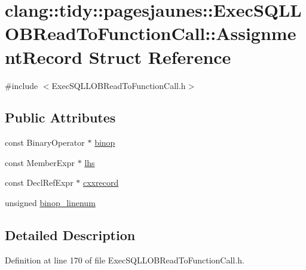 \hypertarget{structclang_1_1tidy_1_1pagesjaunes_1_1_exec_s_q_l_l_o_b_read_to_function_call_1_1_assignment_record}{}\section{clang\+:\+:tidy\+:\+:pagesjaunes\+:\+:Exec\+S\+Q\+L\+L\+O\+B\+Read\+To\+Function\+Call\+:\+:Assignment\+Record Struct Reference}
\label{structclang_1_1tidy_1_1pagesjaunes_1_1_exec_s_q_l_l_o_b_read_to_function_call_1_1_assignment_record}


{\ttfamily \#include $<$Exec\+S\+Q\+L\+L\+O\+B\+Read\+To\+Function\+Call.\+h$>$}

\subsection*{Public Attributes}
\begin{DoxyCompactItemize}
\item 
const Binary\+Operator $\ast$ \hyperlink{structclang_1_1tidy_1_1pagesjaunes_1_1_exec_s_q_l_l_o_b_read_to_function_call_1_1_assignment_record_a6782daae36d05bd1e6c4068d4ecb46b0}{binop}
\item 
const Member\+Expr $\ast$ \hyperlink{structclang_1_1tidy_1_1pagesjaunes_1_1_exec_s_q_l_l_o_b_read_to_function_call_1_1_assignment_record_a0c2c383cb62df6c1a831a41fc2859e81}{lhs}
\item 
const Decl\+Ref\+Expr $\ast$ \hyperlink{structclang_1_1tidy_1_1pagesjaunes_1_1_exec_s_q_l_l_o_b_read_to_function_call_1_1_assignment_record_a66b24c8571d547b8f04b414ddb49b5f2}{cxxrecord}
\item 
unsigned \hyperlink{structclang_1_1tidy_1_1pagesjaunes_1_1_exec_s_q_l_l_o_b_read_to_function_call_1_1_assignment_record_ad419a6bb784be303d699901355dac491}{binop\+\_\+linenum}
\end{DoxyCompactItemize}


\subsection{Detailed Description}


Definition at line 170 of file Exec\+S\+Q\+L\+L\+O\+B\+Read\+To\+Function\+Call.\+h.



